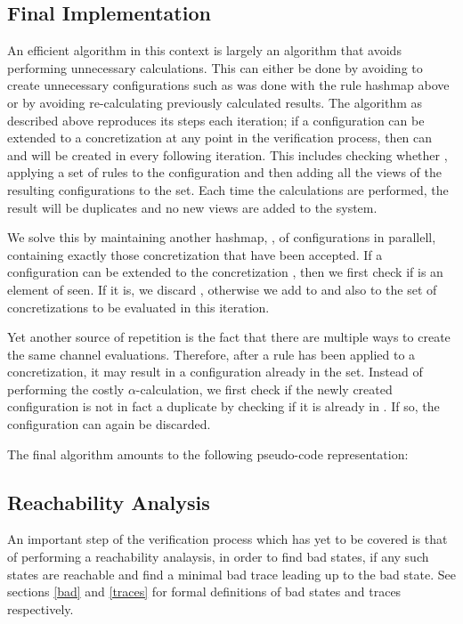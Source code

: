 \newpage
\subsection{Final Implementation}
An efficient algorithm in this context is largely an algorithm that avoids performing unnecessary calculations. This can either be done by avoiding to create unnecessary configurations such as was done with the rule hashmap above or by avoiding re-calculating previously calculated results. The algorithm as described above reproduces its steps each iteration; if a configuration  can be extended to a concretization  at any point in the verification process, then  can and will be created in every following iteration. This includes checking whether , applying a set of rules to the configuration and then adding all the views of the resulting configurations to the set. Each time the calculations are performed, the result will be duplicates and no new views are added to the system.

We solve this by maintaining another hashmap, , of configurations in parallell, containing exactly those concretization that have been accepted. If a configuration  can be extended to the concretization , then we first check if  is an element of seen. If it is, we discard , otherwise we add  to  and also to the set of concretizations to be evaluated in this iteration.

Yet another source of repetition is the fact that there are multiple ways to create the same channel evaluations. Therefore, after a rule has been applied to a concretization, it may result in a configuration already in the set. Instead of performing the costly $\alpha$-calculation, we first check if the newly created configuration is not in fact a duplicate by checking if it is already in . If so, the configuration can again be discarded.

The final algorithm amounts to the following pseudo-code representation:

\subsection{Reachability Analysis}
An important step of the verification process which has yet to be covered is that of performing a reachability analaysis, in order to find bad states, if any such states are reachable and find a minimal bad trace leading up to the bad state. See sections \ref{bad} and \ref{traces} for formal definitions of bad states and traces respectively.

